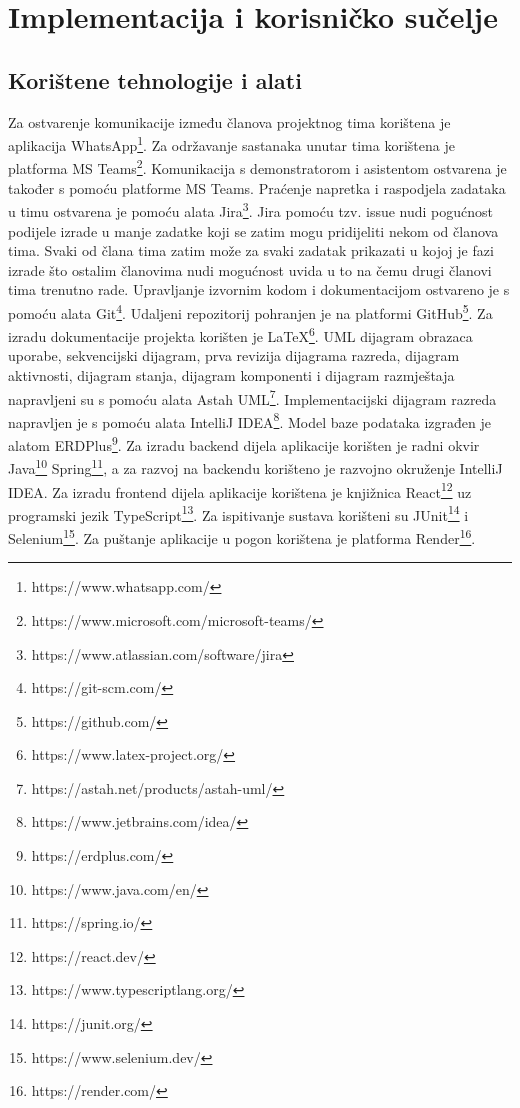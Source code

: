 \chapter{Implementacija i korisničko sučelje}
		
		
		\section{Korištene tehnologije i alati}
		
			
			 
			 Za ostvarenje komunikacije između članova projektnog tima korištena je aplikacija WhatsApp\footnote{https://www.whatsapp.com/}. Za održavanje sastanaka unutar tima korištena je platforma MS Teams\footnote{https://www.microsoft.com/microsoft-teams/}. Komunikacija s demonstratorom i asistentom ostvarena je također s pomoću platforme MS Teams. Praćenje napretka i raspodjela zadataka u timu ostvarena je pomoću alata Jira\footnote{https://www.atlassian.com/software/jira}. Jira pomoću tzv. issue nudi pogućnost podijele izrade u manje zadatke koji se zatim mogu pridijeliti nekom od članova tima. Svaki od člana tima zatim može za svaki zadatak prikazati u kojoj je fazi izrade što ostalim članovima nudi mogućnost uvida u to na čemu drugi članovi tima trenutno rade. Upravljanje izvornim kodom i dokumentacijom ostvareno je s pomoću alata Git\footnote{https://git-scm.com/}. Udaljeni repozitorij pohranjen je na platformi GitHub\footnote{https://github.com/}. Za izradu dokumentacije projekta korišten je LaTeX\footnote{https://www.latex-project.org/}. UML dijagram obrazaca uporabe, sekvencijski dijagram, prva revizija dijagrama razreda, dijagram aktivnosti, dijagram stanja, dijagram komponenti i dijagram razmještaja napravljeni su s pomoću alata Astah UML\footnote{https://astah.net/products/astah-uml/}. Implementacijski dijagram razreda napravljen je s pomoću alata IntelliJ IDEA\footnote{https://www.jetbrains.com/idea/}. Model baze podataka izgrađen je alatom ERDPlus\footnote{https://erdplus.com/}. Za izradu backend dijela aplikacije korišten je radni okvir Java\footnote{https://www.java.com/en/} Spring\footnote{https://spring.io/}, a za razvoj na backendu korišteno je razvojno okruženje IntelliJ IDEA. Za izradu frontend dijela aplikacije korištena je knjižnica React\footnote{https://react.dev/} uz programski jezik TypeScript\footnote{https://www.typescriptlang.org/}. Za ispitivanje sustava korišteni su JUnit\footnote{https://junit.org/} i Selenium\footnote{https://www.selenium.dev/}. Za puštanje aplikacije u pogon korištena je platforma Render\footnote{https://render.com/}.
			
